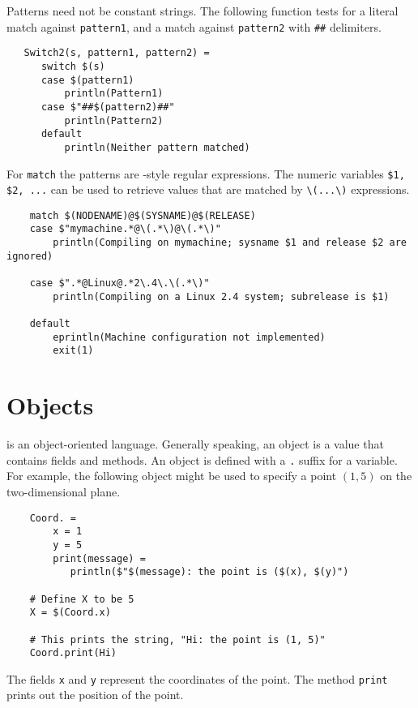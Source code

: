 Patterns need not be constant strings.  The following function tests
for a literal match against \verb+pattern1+, and a match against
\verb+pattern2+ with \verb+##+ delimiters.

\begin{verbatim}
   Switch2(s, pattern1, pattern2) =
      switch $(s)
      case $(pattern1)
          println(Pattern1)
      case $"##$(pattern2)##"
          println(Pattern2)
      default
          println(Neither pattern matched)
\end{verbatim}

For \verb+match+ the patterns are -style regular expressions.
The numeric variables \verb+$1, $2, ...+ can be used to retrieve values
that are matched by \verb+\(...\)+ expressions.

\begin{verbatim}
    match $(NODENAME)@$(SYSNAME)@$(RELEASE)
    case $"mymachine.*@\(.*\)@\(.*\)"
        println(Compiling on mymachine; sysname $1 and release $2 are ignored)

    case $".*@Linux@.*2\.4\.\(.*\)"
        println(Compiling on a Linux 2.4 system; subrelease is $1)

    default
        eprintln(Machine configuration not implemented)
        exit(1)
\end{verbatim}

%
\section{Objects}
\label{section:objects}

\OMake{} is an object-oriented language.  Generally speaking, an object is a value that contains fields
and methods.  An object is defined with a \verb+.+ suffix for a variable.  For example, the
following object might be used to specify a point $(1, 5)$ on the two-dimensional plane.

\begin{verbatim}
    Coord. =
        x = 1
        y = 5
        print(message) =
           println($"$(message): the point is ($(x), $(y)")

    # Define X to be 5
    X = $(Coord.x)

    # This prints the string, "Hi: the point is (1, 5)"
    Coord.print(Hi)
\end{verbatim}

The fields \verb+x+ and \verb+y+ represent the coordinates of the point.  The method \verb+print+
prints out the position of the point.


